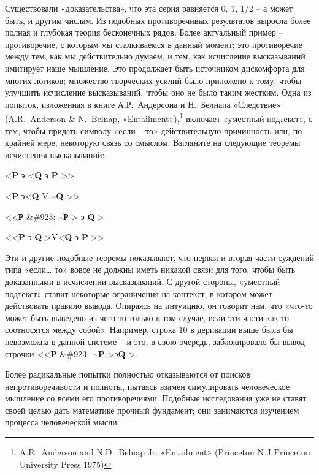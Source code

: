 \documentclass[../main.tex]{subfiles}
\begin{document}
Существовали «доказательства», что эта серия равняется 0, 1, 1/2 \--- а может быть, и другим числам. Из подобных противоречивых результатов выросла более полная и глубокая теория бесконечных рядов. Более актуальный пример \--- противоречие, с которым мы сталкиваемся в данный момент; это противоречие между тем, как мы действительно думаем, и тем, как исчисление высказываний имитирует наше мышление. Это продолжает быть источником дискомфорта для многих логиков; множество творческих усилий было приложено к тому, чтобы улучшить исчисление высказываний, чтобы оно не было таким жестким. Одна из попыток, изложенная в книге А.Р.~Андерсона и Н.~Белнапа «Следствие» (A.R.~Anderson \& N.~Belnap, «Entailment»),\footnote{A.R.~Anderson and N.D.~Belnap Jr. «Entailment» (Princeton N J Princeton University Press 1975)} включает «уместный подтекст», с тем, чтобы придать символу «если \--- то» действительную причинность или, по крайней мере, некоторую связь со смыслом. Взгляните на следующие теоремы исчисления высказываний:

\textless{}\textbf{P} э \textless{}\textbf{Q} э \textbf{P} \textgreater\textgreater{}

\textless{}\textbf{P} э\textless{}\textbf{Q} V \textbf{\textasciitilde Q} \textgreater\textgreater{}

\textless\textless{}\textbf{Р} \&\#923; \textbf{\textasciitilde Р} \textgreater{} э \textbf{Q} \textgreater{}

\textless\textless{}\textbf{P} э \textbf{Q} \textgreater V\textless{}\textbf{Q} э \textbf{P} \textgreater\textgreater{}

Эти и другие подобные теоремы показывают, что первая и вторая части суждений типа «если\ldots{} то» вовсе не должны иметь никакой связи для того, чтобы быть доказанными в исчислении высказываний. С другой стороны, «уместный подтекст» ставит некоторые ограничения на контекст, в котором может действовать правило вывода. Опираясь на интуицию, он говорит нам, что «что-то может быть выведено из чего-то только в том случае, если эти части как-то соотносятся между собой». Например, строка 10 в деривации выше была бы невозможна в данной системе \--- и это, в свою очередь, заблокировало бы вывод строчки \textless\textless{}\textbf{P} \&\#923;~\textbf{\textasciitilde P} \textgreater э\textbf{Q} \textgreater.

Более радикальные попытки полностью отказываются от поисков непротиворечивости и полноты, пытаясь взамен симулировать человеческое мышление со всеми его противоречиями. Подобные исследования уже не ставят своей целью дать математике прочный фундамент; они занимаются изучением процесса человеческой мысли.
\end{document}
